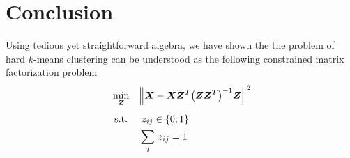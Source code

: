 \documentclass[fleqn]{llncs}
\newcommand{\mat}[1]{\boldsymbol{{#1}}}
\newcommand{\DSQ}[2]{\Bigl \lVert #1 - #2 \Bigr \rVert^2}
\begin{document}
\section{Conclusion}

Using tedious yet straightforward algebra, we have shown the the problem of hard $k$-means clustering can be understood as the following constrained matrix factorization problem
\begin{equation*}
\begin{aligned}
& \min_{\mat{Z}} && \DSQ{\mat{X}}{\mat{X} \mat{Z}^T \bigl(\mat{Z} \mat{Z}^T\bigr)^{-1}\mat{Z}} \\[1ex]
& \text{ s.t.} && \; z_{ij} \in \{0, 1\} \\
&&& \sum_j \, z_{ij} = 1
\end{aligned}
\end{equation*}




\end{document}

